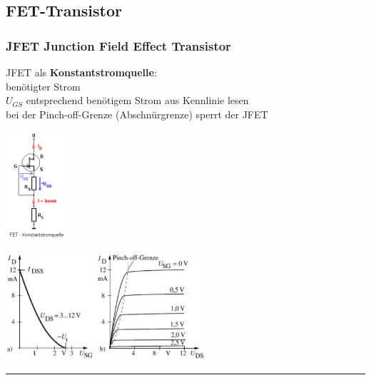         \subsection{FET-Transistor}
            \subsubsection{JFET Junction Field Effect Transistor}
            \begin{minipage}[T]{8cm}
                JFET als {\bf Konstantstromquelle}:\\
                ben\"otigter Strom \\
                $U_{GS}$ entsprechend ben\"otigem Strom aus Kennlinie lesen\\
                bei der Pinch-off-Grenze (Abschn\"urgrenze) sperrt der JFET
            \end{minipage}
            \begin{minipage}[T]{3.4cm}
                \includegraphics[height=4cm]{./bilder/JFETCCQuelle.png}
            \end{minipage}
            \begin{minipage}[T]{6cm}
                \includegraphics[height=4cm]{./bilder/JFETKennlinie.png}
            \end{minipage}
\hrule
